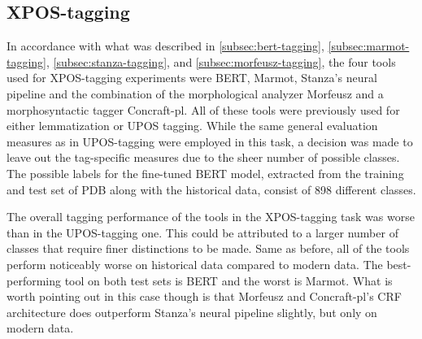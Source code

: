 \subsection{XPOS-tagging}
\label{subsec:xpos-tagging}

In accordance with what was described in \autoref{subsec:bert-tagging}, \autoref{subsec:marmot-tagging}, \autoref{subsec:stanza-tagging}, and \autoref{subsec:morfeusz-tagging}, the four tools used for XPOS-tagging experiments were BERT, Marmot, Stanza's neural pipeline and the combination of the morphological analyzer Morfeusz and a morphosyntactic tagger Concraft-pl. All of these tools were previously used for either lemmatization or UPOS tagging. While the same general evaluation measures as in UPOS-tagging were employed in this task, a decision was made to leave out the tag-specific measures due to the sheer number of possible classes. The possible labels for the fine-tuned BERT model, extracted from the training and test set of PDB along with the historical data, consist of 898 different classes. 

The overall tagging performance of the tools in the XPOS-tagging task was worse than in the UPOS-tagging one. This could be attributed to a larger number of classes that require finer distinctions to be made. Same as before, all of the tools perform noticeably worse on historical data compared to modern data. The best-performing tool on both test sets is BERT and the worst is Marmot. What is worth pointing out in this case though is that Morfeusz and Concraft-pl's CRF architecture does outperform Stanza's neural pipeline slightly, but only on modern data.    

